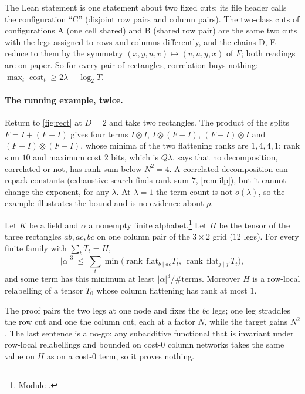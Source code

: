 \documentclass[10pt]{amsart}
\theoremstyle{plain}
\theoremstyle{definition}
\theoremstyle{remark}
\numberwithin{equation}{section}
\newcommand{\rk}{\operatorname{rank}}
\newcommand{\cost}{\operatorname{cost}}
\begin{document}
\noindent The Lean statement is one statement about two fixed cuts; its file header calls the
configuration ``C'' (disjoint row pairs and column pairs). The two-class cuts of configurations A (one
cell shared) and B (shared row pair) are the same two cuts with the legs assigned to rows and columns
differently, and the chains D, E reduce to them by the symmetry $(x,y,u,v)\mapsto(v,u,y,x)$ of $F$; both
readings are on paper. So for every pair of rectangles, correlation buys nothing:
$\max_t\cost_t\ge2\lambda-\log_2T$.

\paragraph{The running example, twice.} Return to \cref{fig:rect} at $D=2$ and take two rectangles. The
product of the splits $F=I+(F-I)$ gives four terms $I\otimes I$, $I\otimes(F-I)$, $(F-I)\otimes I$ and
$(F-I)\otimes(F-I)$, whose minima of the two flattening ranks are $1,4,4,1$: rank sum $10$ and maximum
cost $2$ bits, which is $Q\lambda$.  says that no decomposition, correlated or not, has rank
sum below $N^2=4$. A correlated decomposition can repack constants (exhaustive search finds rank sum $7$,
\cref{rem:ilp}), but it cannot change the exponent, for any $\lambda$. At $\lambda=1$ the term count is not
$o(\lambda)$, so the example illustrates the bound and is no evidence about $\rho$.

\begin{theorem}\label{thm:grid32}
Let $K$ be a field and $\alpha$ a nonempty finite alphabet.\footnote{Module
.} Let $H$ be the tensor of the three
rectangles $ab,ac,bc$ on one column pair of the $3\times2$ grid ($12$ legs). For every finite family
with $\sum_tT_t=H$,
\[
  |\alpha|^3\ \le\ \sum_t\min\bigl(\rk\,\mathrm{flat}_{b\mid ac}T_t,\ \rk\,\mathrm{flat}_{j\mid j'}T_t\bigr),
\]
and some term has this minimum at least $|\alpha|^3/\#\text{terms}$. Moreover $H$ is a row-local
relabelling of a tensor $T_0$ whose column flattening has rank at most $1$.
\end{theorem}

\noindent The proof pairs the two legs at one node and fixes the $bc$ legs; one leg straddles the row cut
and one the column cut, each at a factor $N$, while the target gains $N^2$. The last sentence is a
no-go: any subadditive functional that is invariant under row-local relabellings and bounded on cost-$0$
column networks takes the same value on $H$ as on a cost-$0$ term, so it proves nothing.
\end{document}
